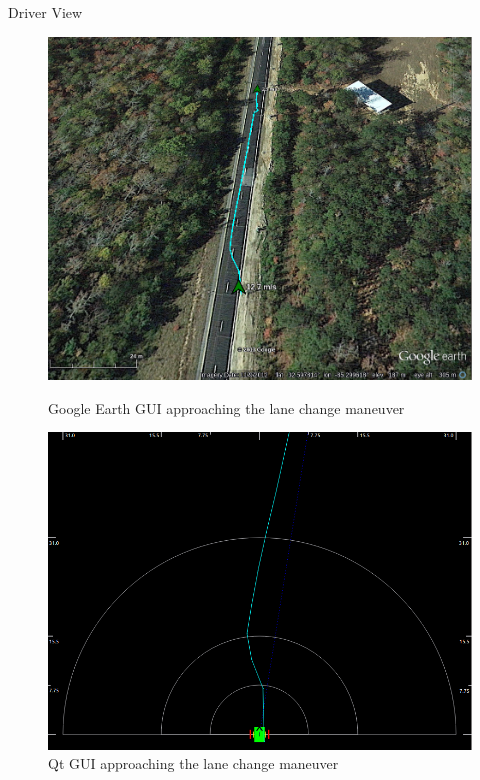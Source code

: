\documentclass{beamer}
\begin{document}
    \begin{frame}{Driver View}
      \begin{figure}[ht] \centering
        \begin{minipage}[b]{0.45\linewidth} \centering 
          \includegraphics[width=\textwidth]{../graphics/lane_change.png}
          \caption{Google Earth GUI approaching the lane change maneuver}
        \end{minipage}
        \hspace{0.5cm}
        \begin{minipage}[b]{0.45\linewidth} \centering
          \includegraphics[width=\textwidth]{../graphics/lane_change_mono.png} 
          \caption{Qt GUI approaching the lane change maneuver}
        \end{minipage}
    \end{figure}
    \end{frame}
\end{document}
